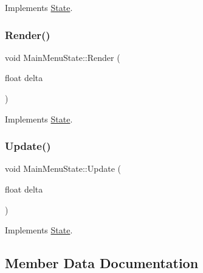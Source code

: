 Implements \hyperlink{classState_a1705412877f37a5cc8fc712542756076}{State}.

\mbox{\label{classMainMenuState_af675ec319923f1cf22446808a7735dea}} 
\subsubsection{\texorpdfstring{Render()}{Render()}}
{\footnotesize\ttfamily void Main\+Menu\+State\+::\+Render (\begin{DoxyParamCaption}\item[{float}]{delta }\end{DoxyParamCaption})\hspace{0.3cm}{\ttfamily [virtual]}}



Implements \hyperlink{classState_a0e48dfae1e3090630475812681417c5f}{State}.

\mbox{\label{classMainMenuState_a1605be0d2e5228643d911c7069db3196}} 
\subsubsection{\texorpdfstring{Update()}{Update()}}
{\footnotesize\ttfamily void Main\+Menu\+State\+::\+Update (\begin{DoxyParamCaption}\item[{float}]{delta }\end{DoxyParamCaption})\hspace{0.3cm}{\ttfamily [virtual]}}



Implements \hyperlink{classState_aac0d3fdee1341e168af730b8f31a7bf1}{State}.



\subsection{Member Data Documentation}
\mbox{\label{classMainMenuState_aa92b097f34007a1fc8223aa43062af46}} 
